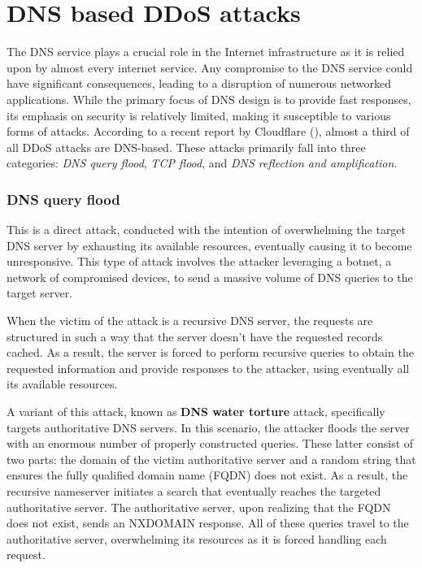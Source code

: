 \section{DNS based DDoS attacks}
The DNS service plays a crucial role in the Internet infrastructure as it is relied upon by almost every internet service. 
Any compromise to the DNS service could have significant consequences, leading to a disruption of numerous networked applications. 
While the primary focus of DNS design is to provide fast responses, its emphasis on security is relatively limited, making 
it susceptible to various forms of attacks. According to a recent report by Cloudflare (\cite{DDoSthreatreport}), almost a third
of all DDoS attacks are DNS-based. These attacks primarily fall into three categories:
\textit{DNS query flood}, \textit{TCP flood}, and \textit{DNS reflection and amplification}.

\subsubsection*{DNS query flood}
This is a direct attack, conducted with the intention of overwhelming the target DNS server by exhausting its available resources, 
eventually causing it to become unresponsive. This type of attack involves the attacker leveraging a botnet, a network of 
compromised devices, to send a massive volume of DNS queries to the target server.

When the victim of the attack is a recursive DNS server, the requests are structured in such a way that the server doesn't 
have the requested records cached. As a result, the server is forced to perform recursive queries to obtain the requested 
information and provide responses to the attacker, using eventually all its available resources.

A variant of this attack, known as \textbf{DNS water torture} attack, specifically targets authoritative DNS servers. 
In this scenario, the attacker floods the server with an enormous number of properly constructed queries.
These latter consist of two parts: the domain of the victim authoritative server and a random 
string that ensures the fully qualified domain name (FQDN) does not exist. As a result, the recursive nameserver initiates 
a search that eventually reaches the targeted authoritative server. The authoritative server, upon realizing that the FQDN 
does not exist, sends an NXDOMAIN response. All of these queries travel to the authoritative server, overwhelming its 
resources as it is forced handling each request.

